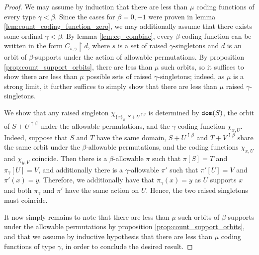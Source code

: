 \documentclass{article}
\theoremstyle{definition}
\theoremstyle{remark}
\begin{document}
\begin{proof}
  We may assume by induction that there are less than $\mu$ coding functions of every type $\gamma < \beta$.
  Since the cases for $\beta = 0, -1$ were proven in lemma \ref{lem:count_coding_function_zero}, we may additionally assume that there exists some ordinal $\gamma < \beta$.
  By lemma \ref{lem:eq_combine}, every $\beta$-coding function can be written in the form $C_{s,\gamma} \restriction d$, where $s$ is a set of raised $\gamma$-singletons and $d$ is an orbit of $\beta$-supports under the action of allowable permutations.
  By proposition \ref{prop:count_support_orbits}, there are less than $\mu$ such orbits, so it suffices to show there are less than $\mu$ possible sets of raised $\gamma$-singletons; indeed, as $\mu$ is a strong limit, it further suffices to simply show that there are less than $\mu$ raised $\gamma$-singletons.

  We show that any raised singleton $\chi_{\{x\}_\beta,S + U^{\uparrow \beta}}$ is determined by ${\tt dom}(S)$, the orbit of $S + U^{\uparrow \beta}$ under the allowable permutations, and the $\gamma$-coding function $\chi_{x,U}$.
  Indeed, suppose that $S$ and $T$ have the same domain, $S + U^{\uparrow \beta}$ and $T + V^{\uparrow \beta}$ share the same orbit under the $\beta$-allowable permutations, and the coding functions $\chi_{x,U}$ and $\chi_{y,V}$ coincide.
  Then there is a $\beta$-allowable $\pi$ such that $\pi[S] = T$ and $\pi_\gamma[U] = V$, and additionally there is a $\gamma$-allowable $\pi'$ such that $\pi'[U] = V$ and $\pi'(x) = y$.
  Therefore, we additionally have that $\pi_\gamma(x) = y$ as $U$ supports $x$ and both $\pi_\gamma$ and $\pi'$ have the same action on $U$.
  Hence, the two raised singletons must coincide.

  It now simply remains to note that there are less than $\mu$ such orbits of $\beta$-supports under the allowable permutations by proposition \ref{prop:count_support_orbits}, and that we assume by inductive hypothesis that there are less than $\mu$ coding functions of type $\gamma$, in order to conclude the desired result.
\end{proof}
\end{document}
